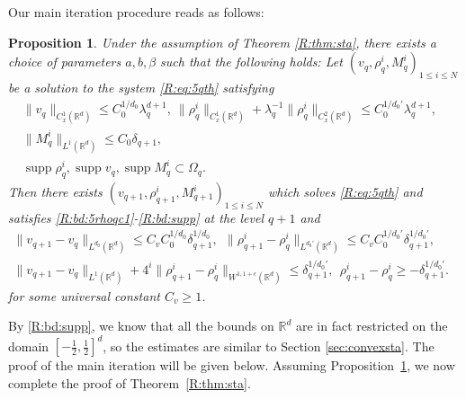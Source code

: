 \documentclass[UTF-8,reqno]{amsart}
\numberwithin{equation}{section}
\newtheorem{proposition}[theorem]{Proposition}
\theoremstyle{definition}
\DeclareMathOperator{\supp}{supp}
\def\geq{\geqslant}
\def\leq{\leqslant}
\def\bp{\begin{proposition}}
\def\ep{\end{proposition}}
\def\geq{\geqslant}
\def\leq{\leqslant}
\begin{document}
      Our main iteration procedure reads as follows:
\bp\label{R:prop:sta}
Under the assumption of Theorem \ref{R:thm:sta}, there exists  a choice of parameters $a,b,\beta$  such
that the following holds: Let $(v_q,  \rho^i_q,  M^i_q)_{1\leq i \leq N}$ be a solution to the system \eqref{R:eq:5qth} satisfying \begin{align}
\|v_q\|_ {C_{x}^1(\mathbb{R}^d)}\leq C_0^{1/d_0}\lambda_q^{ d+1},\
\|  \rho^i_{q}\|_ {C_{x}^1(\mathbb{R}^d)}+\lambda_q^{-1}\|  \rho^i_{q}\|_ {C_{x}^2(\mathbb{R}^d)}\leq C_0^{1/d_0'} \lambda_q^{ d+1},
\label{R:bd:5rhoqc1}\\
 \|M^i_q\|_{L^1(\mathbb{R}^d)}\leq C_0 \delta_{q+1},&\label{R:bd:5rql1}\\
 \supp\rho_q^i,\supp v_q,\supp M_q^i\subset\Omega_q.&\label{R:bd:supp}
\end{align}
Then there exists 
$(v_{q+1},  \rho^i_{q+1},  M^i_{q+1})_{1\leq i \leq N}$ which solves \eqref{R:eq:5qth} and satisfies \eqref{R:bd:5rhoqc1}-\eqref{R:bd:supp} at the level $q+1$ and
\begin{align}
\|v_{q+1}-v_{q}\|_{L^{d_0}(\mathbb{R}^d)}\leq
C_vC_0^{1/d_0}\delta_{q+1}^{1/d_0},\label{R:bd:5vq+1-vqldd}\ \
\|  \rho^i_{q+1}-  \rho^i_{q}\|_{L^{d_0'}(\mathbb{R}^d)}\leq 
C_v C_0^{1/{d_0'}}\delta_{q+1}^{1/{d_0'}},&\\%
 \|v_{q+1}-v_{q}\|_{L^{1}(\mathbb{R}^d)}+ 4^{i}\|  \rho^i_{q+1}-  \rho^i_{q}\|_{W^{1,1+\epsilon}(\mathbb{R}^d)}\leq 
 \delta_{q+1}^{1/d_0'},\  \ \rho^i_{q+1} -   \rho^i_q\geq - \delta_{q+1}^{1/d_0'}.&\label{R:bd:5rhoq+1-rhoql1}
\end{align}for some universal constant $C_v\geq1$.  
\ep
  

By \eqref{R:bd:supp}, we know that all the bounds on $\mathbb{R}^d$ are in fact restricted on the domain $[-\frac12,\frac12]^d$, so the estimates are similar to Section \ref{sec:convexsta}. 
The proof of the main iteration  will be given below. 
Assuming Proposition~\ref{R:prop:sta}, we now complete the proof of Theorem~\ref{R:thm:sta}.
 
\end{document}
